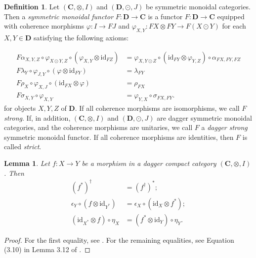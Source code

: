 \documentclass[12pt]{tac}
\newtheorem{lemma}[theorem]{Lemma}
\theoremstyle{definition}
\newtheorem{definition}[theorem]{Definition}
\theoremstyle{remark}
\newcommand{\<}{\langle}
\renewcommand{\>}{\rangle}
\renewcommand{\:}{\colon}
\newcommand{\id}{\mathrm{id}}
\begin{document}
\begin{definition}\label{def:dagger strong monoidal functor}
    Let $(\mathbf C,\otimes,I)$ and $(\mathbf D,\odot,J)$ be  symmetric monoidal categories. Then a \emph{symmetric monoidal functor} $F:\mathbf D\to\mathbf C$ is a functor $F:\mathbf D\to\mathbf C$ equipped with coherence morphisms $\varphi:I\to FJ$ and $\varphi_{X,Y}:FX\otimes FY\to F(X\odot Y)$ for each $X,Y\in\mathbf D$ satisfying the following axioms:
    
\begin{align}\label{eq:coherence1}
F\alpha_{X,Y,Z}\circ\varphi_{X\odot Y,Z}\circ(\varphi_{X,Y}\otimes\id_{FZ}) & =   \varphi_{X,Y\odot Z}\circ(\id_{FY}\otimes\varphi_{Y,Z})\circ\alpha_{FX,FY,FZ}\\
    \label{eq:coherence2}
    F\lambda_Y\circ\varphi_{J,Y}\circ (\varphi\otimes\id_{FY}) & = \lambda_{FY}\\
    \label{eq:coherence3}
     F\rho_X\circ\varphi_{X,J}\circ(\id_{FX}\otimes\varphi) & = \rho_{FX}\\
     \label{eq:coherence4}
     F\sigma_{X,Y}\circ\varphi_{X,Y}& =\varphi_{Y,X}\circ\sigma_{FX,FY}.
    \end{align}
for objects $X,Y,Z$ of $\mathbf D$. If all coherence morphisms are isomorphisms, we call $F$ \emph{strong}. If, in addition, $(\mathbf C,\otimes,I)$ and $(\mathbf D,\odot,J)$ are dagger symmetric monoidal categories, and the coherence morphisms are unitaries, we call $F$ a \emph{dagger strong} symmetric monoidal functor. If all coherence morphisms are identities, then $F$ is called \emph{strict}.
    \end{definition}


\begin{lemma}\label{lem:dagger_and_dual}
    Let $f:X\to Y$ be a morphism in a dagger compact category $(\mathbf C,\otimes, I)$. 
    Then 
    \begin{align*}
        (f^*)^\dag & =(f^\dag)^*;\\
        \epsilon_Y\circ(f\otimes \id_{Y^*}) & = \epsilon_X\circ(\id_X\otimes f^*);\\
        (\id_{X^*}\otimes f)\circ \eta_X & =(f^*\otimes \id_Y)\circ \eta_Y.
          \end{align*}
\end{lemma}
\begin{proof}
For the first equality, see \cite[Lemma 3.55]{heunenvicary}. For the remaining equalities, see Equation (3.10) in Lemma 3.12 of \cite{heunenvicary}.
\end{proof}
\end{document}
